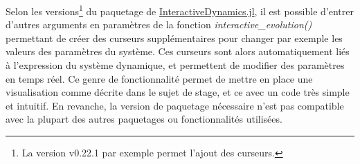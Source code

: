 \documentclass[a4paper, french, 12pt, titlepage]{article}
\begin{document}
Selon les versions\footnote{La version v0.22.1 par exemple permet l'ajout des curseurs.} du paquetage de \href{https://juliadynamics.github.io/InteractiveDynamics.jl/dev/dynamicalsystems/}{InteractiveDynamics.jl}, il est possible d'entrer d'autres arguments en paramètres de la fonction \emph{interactive\_evolution()} permettant de créer des curseurs supplémentaires pour changer par exemple les valeurs des paramètres du système.
Ces curseurs sont alors automatiquement liés à l'expression du système dynamique, et permettent de modifier des paramètres en temps réel.
Ce genre de fonctionnalité permet de mettre en place une visualisation comme décrite dans le sujet de stage, et ce avec un code très simple et intuitif.
En revanche, la version de paquetage nécessaire n'est pas compatible avec la plupart des autres paquetages ou fonctionnalités utilisées. 
\end{document}
